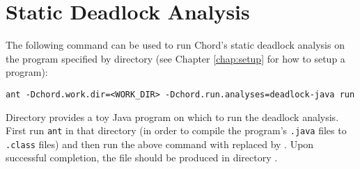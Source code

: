 \section{Static Deadlock Analysis}

The following command can be used to run Chord's static deadlock analysis on the
program specified by directory  (see Chapter \ref{chap:setup}
for how to setup a program):

\begin{framed}
\begin{verbatim}
ant -Dchord.work.dir=<WORK_DIR> -Dchord.run.analyses=deadlock-java run
\end{verbatim}
\end{framed}

Directory  provides a toy Java program on which to
run the deadlock analysis.  First run {\tt ant} in that directory (in order to
compile the program's {\tt .java} files to {\tt .class} files) and then run the
above command with  replaced by .
Upon successful completion, the file  should be produced in
directory .


